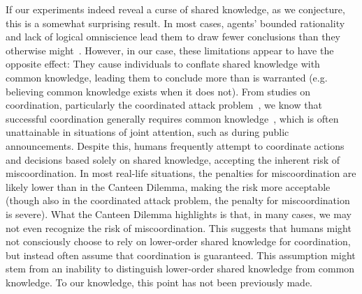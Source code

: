 If our experiments indeed reveal a curse of shared knowledge, as we conjecture, this is a somewhat surprising result. In most cases, agents' bounded rationality and lack of logical omniscience lead them to draw fewer conclusions than they otherwise might~\cite{fagin1995reasoning, halpern2011dealing}. However, in our case, these limitations appear to have the opposite effect: They cause individuals to conflate shared knowledge with common knowledge, leading them to conclude more than is warranted (e.g. believing common knowledge exists when it does not). From studies on coordination, particularly the coordinated attack problem~\cite{fagin1995reasoning}, we know that successful coordination generally requires common knowledge~\cite{moses2016relating}, which is often unattainable in situations of joint attention, such as during public announcements. Despite this, humans frequently attempt to coordinate actions and decisions based solely on shared knowledge, accepting the inherent risk of miscoordination. In most real-life situations, the penalties for miscoordination are likely lower than in the Canteen Dilemma, making the risk more acceptable (though also in the coordinated attack problem, the penalty for miscoordination is severe). What the Canteen Dilemma highlights is that, in many cases, we may not even recognize the risk of miscoordination. This suggests that humans might not consciously choose to rely on lower-order shared knowledge for coordination, but instead often assume that coordination is guaranteed. This assumption might stem from an inability to distinguish lower-order shared knowledge from common knowledge. To our knowledge, this point has not been previously made.

 

